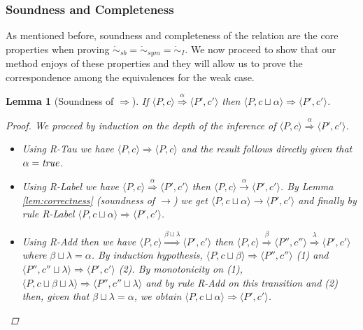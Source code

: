 \documentclass[copyright,creativecommons]{eptcs}
\newcommand{\true}{{\it true}}
\newcommand{\rrarrow}{\longrightarrow}
\newcommand{\pairccp}[2]{\langle #1,#2 \rangle}
\newcommand{\trans}[1]{\stackrel{#1}{\rrarrow}}
\newcommand{\satstbisim}{\dot{\sim}_{sb}}
\newtheorem{lemma}{Lemma}
\newcommand{\newtrans}[1]{\stackrel{#1}{\Longrightarrow}}
\newcommand{\A}{\alpha}
\newcommand{\B}{\beta}
\newcommand{\C}{\lambda}
\newcommand{\conf}[2]{\pairccp{#1}{#2}}
\newcommand{\transition}[5]{\conf{#1}{#2} \trans{#3} \conf{#4}{#5}}
\newcommand{\newtransition}[5]{\conf{#1}{#2} \newtrans{#3} \conf{#4}{#5}}
\newcommand{\lub}{\sqcup}
\newcommand{\irrbis}{\dot{\sim}_{I}}
\newcommand{\symbis}{\dot{\sim}_{sym}}
\newcommand{\rTau}{{\sf R-Tau} }
\newcommand{\rLabel}{{\sf R-Label} }
\newcommand{\rAdd}{{\sf R-Add} }
\begin{document}
\subsubsection{Soundness and Completeness} \label{sssec:soundCompleteNewLTS}
As mentioned before, soundness and completeness of the relation
are the core properties when proving $\satstbisim = \symbis = \irrbis$.
We now proceed to show that our method enjoys of these properties and they
will allow us to prove the correspondence among the equivalences for the weak case.

\begin{lemma}[Soundness of $\newtrans{}$]
\label{lem:soundnessNew}
If $\newtransition{P}{c}{\A}{P'}{c'}$ then $\newtransition{P}{c \lub \A}{}{P'}{c'}$.
\begin{proof}
We proceed by induction on the depth of the inference of $\newtransition{P}{c}{\A}{P'}{c'}$.
\begin{itemize}
 \item Using \rTau we have $\newtransition{P}{c}{}{P}{c}$ and the result follows directly given that $\A = \true$.
 \item Using \rLabel we have $\newtransition{P}{c}{\A}{P'}{c'}$ then $\transition{P}{c}{\A}{P'}{c'}$. By Lemma \ref{lem:correctness} (soundness of $\trans{}$) we get $\transition{P}{c \lub \A}{}{P'}{c'}$ and finally by rule \rLabel $\newtransition{P}{c \lub \A}{}{P'}{c'}$.
 \item Using \rAdd then we have $\newtransition{P}{c}{\B \lub \C}{P'}{c'}$ then $\newtransition{P}{c}{\B}{P''}{c''} \newtrans{\C} \conf{P'}{c'}$ where $\B \lub \C = \A$. By induction hypothesis, $\newtransition{P}{c \lub \B}{}{P''}{c''}$ (1) and $\newtransition{P''}{c'' \lub \C}{}{P'}{c'}$ (2). By monotonicity on (1), $\newtransition{P}{c \lub \B \lub \C}{}{P''}{c'' \lub \C}$ and by rule \rAdd on this transition and (2) then, given that $\B \lub \C = \A$, we obtain $\newtransition{P}{c \lub \A}{}{P'}{c'}$.
\end{itemize}
\end{proof}
\end{lemma}
\end{document}
